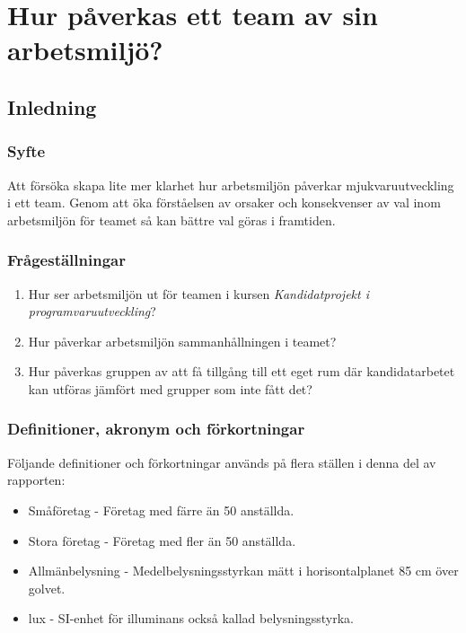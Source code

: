 \chapter{Hur påverkas ett team av sin arbetsmiljö?}
\label{cha:indiv-report-hampus}

\section{Inledning}
\label{sec:introduction-hampus}


\subsection{Syfte}
\label{sec:purpose-hampus}

Att försöka skapa lite mer klarhet hur  arbetsmiljön påverkar mjukvaruutveckling i ett team. Genom att öka förståelsen av orsaker och konsekvenser av val inom arbetsmiljön för teamet så kan bättre val göras i framtiden.

\subsection{Frågeställningar}
\label{sec:issue-hampus}

\begin{enumerate}
\item Hur ser arbetsmiljön ut för teamen i kursen \textit{Kandidatprojekt i programvaruutveckling}?
\item Hur påverkar arbetsmiljön sammanhållningen i teamet?
\item Hur påverkas gruppen av att få tillgång till ett eget rum där kandidatarbetet kan utföras jämfört med grupper som inte fått det?
\end{enumerate}

\subsection{Definitioner, akronym och förkortningar}
Följande definitioner och förkortningar används på flera ställen i denna del av rapporten:

\begin{itemize}
\item Småföretag - Företag med färre än 50 anställda.
\item Stora företag - Företag med fler än 50 anställda.
\item Allmänbelysning - Medelbelysningsstyrkan mätt i horisontalplanet 85 cm över golvet.
\item lux - SI-enhet för illuminans också kallad belysningsstyrka.
\end{itemize}

